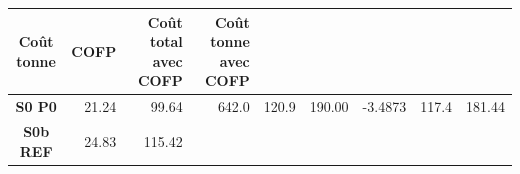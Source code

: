 \documentclass[]{article}
\begin{document}
\begin{longtable}[]{@{}crrrrrrrr@{}}
\begin{minipage}[b]{0.07\columnwidth}
Coût tonne\strut
\end{minipage} & \begin{minipage}[b]{0.05\columnwidth}\raggedleft\strut
COFP\strut
\end{minipage} & \begin{minipage}[b]{0.13\columnwidth}\raggedleft\strut
Coût total avec COFP\strut
\end{minipage} & \begin{minipage}[b]{0.13\columnwidth}\raggedleft\strut
Coût tonne avec COFP\strut
\end{minipage}\tabularnewline
\midrule
\endhead
\begin{minipage}[t]{0.08\columnwidth}\centering\strut
\textbf{S0 P0}\strut
\end{minipage} & \begin{minipage}[t]{0.09\columnwidth}\raggedleft\strut
21.24\strut
\end{minipage} & \begin{minipage}[t]{0.06\columnwidth}\raggedleft\strut
99.64\strut
\end{minipage} & \begin{minipage}[t]{0.06\columnwidth}\raggedleft\strut
642.0\strut
\end{minipage} & \begin{minipage}[t]{0.07\columnwidth}\raggedleft\strut
120.9\strut
\end{minipage} & \begin{minipage}[t]{0.07\columnwidth}\raggedleft\strut
190.00\strut
\end{minipage} & \begin{minipage}[t]{0.05\columnwidth}\raggedleft\strut
-3.4873\strut
\end{minipage} & \begin{minipage}[t]{0.13\columnwidth}\raggedleft\strut
117.4\strut
\end{minipage} & \begin{minipage}[t]{0.13\columnwidth}\raggedleft\strut
181.44\strut
\end{minipage}\tabularnewline
\begin{minipage}[t]{0.08\columnwidth}\centering\strut
\textbf{S0b REF}\strut
\end{minipage} & \begin{minipage}[t]{0.09\columnwidth}\raggedleft\strut
24.83\strut
\end{minipage} & \begin{minipage}[t]{0.06\columnwidth}\raggedleft\strut
115.42\strut
\end{minipage} & \begin{minipage}[t]{0.06\columnwidth}\raggedleft\strut

\end{minipage}
\end{longtable}
\end{document}
